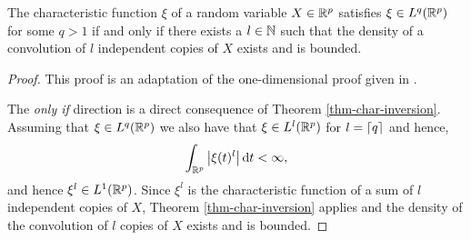 \begin{lemma} \label{lem-char-integrable-convolution}
    The characteristic function $\xi$ of a random variable $X \in \Rp$ satisfies $\xi \in L^q(\Rp)$ for some $q > 1$ if and only if there exists a $l \in \N$ such that the density of a convolution of $l$ independent copies of $X$ exists and is bounded.
\end{lemma}
\begin{proof}
    This proof is an adaptation of the one-dimensional proof given in \cite[Lemma 2.4.4]{kolassa2006series}.

    The \textit{only if} direction is a direct consequence of Theorem \ref{thm-char-inversion}. Assuming that $\xi \in L^q(\Rp)$ we also have that $\xi \in L^l(\Rp)$ for $l = \ceil{q}$ and hence,
    \begin{equation*}
        \intRp{t}{\abs{\xi(t)^l}} < \infty,
    \end{equation*}
    and hence $\xi^l \in L^1(\Rp)$. Since $\xi^l$ is the characteristic function of a sum of $l$ independent copies of $X$, Theorem \ref{thm-char-inversion} applies and the density of the convolution of $l$ copies of $X$ exists and is bounded.


\end{proof}

